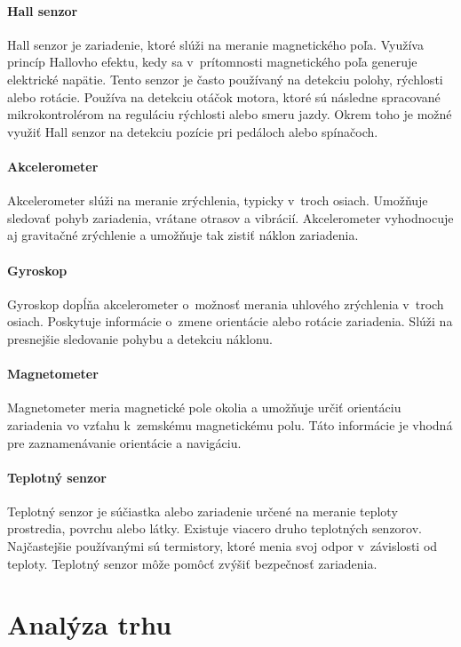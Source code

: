 \subsubsection{Hall senzor}
Hall senzor je zariadenie, ktoré slúži na meranie magnetického poľa.
Využíva princíp Hallovho efektu, kedy sa v~prítomnosti magnetického poľa generuje elektrické napätie.
Tento senzor je často používaný na detekciu polohy, rýchlosti alebo rotácie.
Používa na detekciu otáčok motora, ktoré sú následne spracované mikrokontrolérom na reguláciu rýchlosti alebo smeru jazdy.
Okrem toho je možné využiť Hall senzor na detekciu pozície pri pedáloch alebo spínačoch.\cite{Soltero}

\subsubsection{Akcelerometer}
Akcelerometer slúži na meranie zrýchlenia, typicky v~troch osiach.
Umožňuje sledovať pohyb zariadenia, vrátane otrasov a vibrácií.
Akcelerometer vyhodnocuje aj gravitačné zrýchlenie a umožňuje tak zistiť náklon zariadenia.\cite{Adafruit}

\subsubsection{Gyroskop}
Gyroskop dopĺňa akcelerometer o~možnosť merania uhlového zrýchlenia v~troch osiach.
Poskytuje informácie o~zmene orientácie alebo rotácie zariadenia.
Slúži na presnejšie sledovanie pohybu a detekciu náklonu.\cite{Adafruit}

\subsubsection{Magnetometer}
Magnetometer meria magnetické pole okolia a umožňuje určiť orientáciu zariadenia vo vzťahu k~zemskému magnetickému polu.
Táto informácie je vhodná pre zaznamenávanie orientácie a navigáciu.\cite{Adafruit}

\subsubsection{Teplotný senzor}
Teplotný senzor je súčiastka alebo zariadenie určené na meranie teploty prostredia, povrchu alebo látky.
Existuje viacero druho teplotných senzorov. Najčastejšie používanými sú termistory, ktoré menia svoj odpor v~závislosti od teploty.
Teplotný senzor môže pomôcť zvýšiť bezpečnosť zariadenia.\cite{IQS}

\chapter{Analýza trhu}\label{analyza_trhu}


